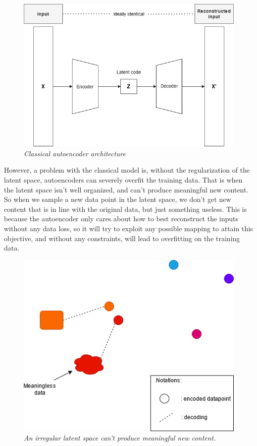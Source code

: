 \documentclass[12pt]{report}
\begin{document}
\begin{figure}[H]
	\centering
	\includegraphics[scale=0.7]{autoencoder-architecture}
	\caption{\textit{Classical autoencoder architecture \cite{autoencoder}}}
	\label{fig:autoencoder-architecture}
\end{figure}

However, a problem with the classical model is, without the regularization of the latent space, autoencoders can severely overfit the training data. That is when the latent space isn't well organized, and can't produce meaningful new content. So when we sample a new data point in the latent space, we don't get new content that is in line with the original data, but just something useless. This is because the autoencoder only cares about how to best reconstruct the inputs without any data loss, so it will try to exploit any possible mapping to attain this objective, and without any constraints, will lead to overfitting on the training data.

\begin{figure}[H]
	\centering
	\includegraphics[scale=0.7]{irregular-latent}
	\caption{\textit{An irregular latent space can't produce meaningful new content.}}
	\label{fig:irregular-latent}
\end{figure}
\end{document}
